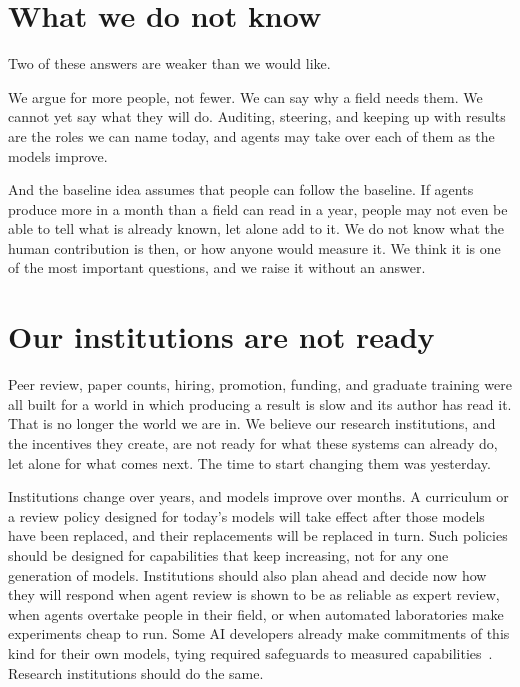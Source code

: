 \documentclass[11pt]{article}
\begin{document}
\section*{What we do not know}

Two of these answers are weaker than we would like.

We argue for more people, not fewer.
We can say why a field needs them.
We cannot yet say what they will do.
Auditing, steering, and keeping up with results are the roles we can name today, and agents may take over each of them as the models improve.

And the baseline idea assumes that people can follow the baseline.
If agents produce more in a month than a field can read in a year, people may not even be able to tell what is already known, let alone add to it.
We do not know what the human contribution is then, or how anyone would measure it.
We think it is one of the most important questions, and we raise it without an answer.

\section*{Our institutions are not ready}

Peer review, paper counts, hiring, promotion, funding, and graduate training were all built for a world in which producing a result is slow and its author has read it.
That is no longer the world we are in.
We believe our research institutions, and the incentives they create, are not ready for what these systems can already do, let alone for what comes next.
The time to start changing them was yesterday.

Institutions change over years, and models improve over months.
A curriculum or a review policy designed for today's models will take effect after those models have been replaced, and their replacements will be replaced in turn.
Such policies should be designed for capabilities that keep increasing, not for any one generation of models.
Institutions should also plan ahead and decide now how they will respond when agent review is shown to be as reliable as expert review, when agents overtake people in their field, or when automated laboratories make experiments cheap to run.
Some AI developers already make commitments of this kind for their own models, tying required safeguards to measured capabilities~\citep{anthropic2026rsp}.
Research institutions should do the same.
\end{document}
